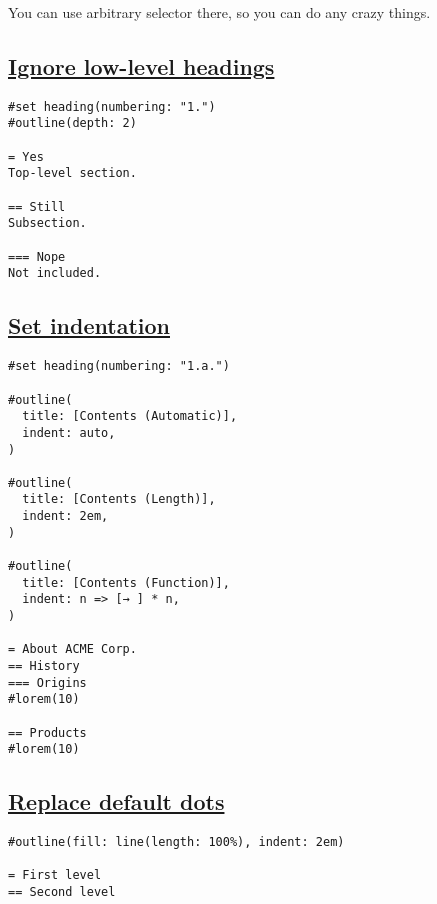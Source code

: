 You can use arbitrary selector there, so you can do any crazy things.

\subsection{\texorpdfstring{\hyperref[ignore-low-level-headings]{Ignore
low-level
headings}}{Ignore low-level headings}}\label{ignore-low-level-headings}

\begin{verbatim}
#set heading(numbering: "1.")
#outline(depth: 2)

= Yes
Top-level section.

== Still
Subsection.

=== Nope
Not included.
\end{verbatim}

\pandocbounded{}

\subsection{\texorpdfstring{\hyperref[set-indentation]{Set
indentation}}{Set indentation}}\label{set-indentation}

\begin{verbatim}
#set heading(numbering: "1.a.")

#outline(
  title: [Contents (Automatic)],
  indent: auto,
)

#outline(
  title: [Contents (Length)],
  indent: 2em,
)

#outline(
  title: [Contents (Function)],
  indent: n => [→ ] * n,
)

= About ACME Corp.
== History
=== Origins
#lorem(10)

== Products
#lorem(10)
\end{verbatim}

\pandocbounded{}

\subsection{\texorpdfstring{\hyperref[replace-default-dots]{Replace
default dots}}{Replace default dots}}\label{replace-default-dots}

\begin{verbatim}
#outline(fill: line(length: 100%), indent: 2em)

= First level
== Second level
\end{verbatim}

